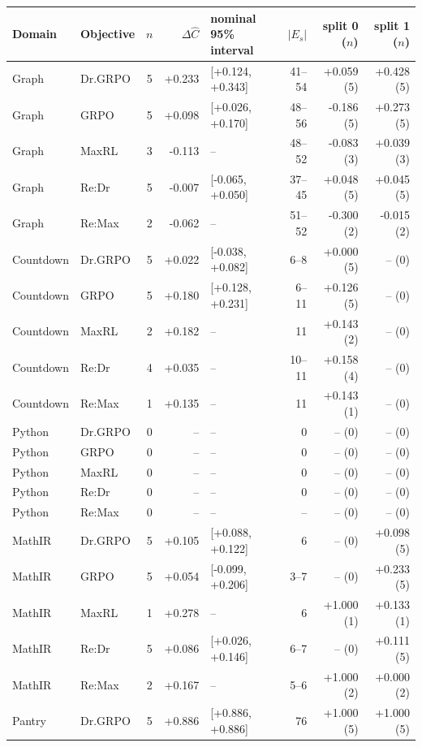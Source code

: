 \begin{table}[!htbp]
\centering
\scriptsize
\setlength{\tabcolsep}{3pt}
\begin{tabular}{@{}llcrlrrr@{}}
\toprule
Domain & Objective & $n$ & $\Delta\widehat C$ & nominal 95\% interval & $|E_s|$ & split 0 ($n$) & split 1 ($n$) \\
\midrule
Graph & Dr.GRPO & 5 & +0.233 & [+0.124, +0.343] & 41--54 & +0.059 (5) & +0.428 (5) \\
Graph & GRPO & 5 & +0.098 & [+0.026, +0.170] & 48--56 & -0.186 (5) & +0.273 (5) \\
Graph & MaxRL & 3 & -0.113 & -- & 48--52 & -0.083 (3) & +0.039 (3) \\
Graph & Re:Dr & 5 & -0.007 & [-0.065, +0.050] & 37--45 & +0.048 (5) & +0.045 (5) \\
Graph & Re:Max & 2 & -0.062 & -- & 51--52 & -0.300 (2) & -0.015 (2) \\
Countdown & Dr.GRPO & 5 & +0.022 & [-0.038, +0.082] & 6--8 & +0.000 (5) & -- (0) \\
Countdown & GRPO & 5 & +0.180 & [+0.128, +0.231] & 6--11 & +0.126 (5) & -- (0) \\
Countdown & MaxRL & 2 & +0.182 & -- & 11 & +0.143 (2) & -- (0) \\
Countdown & Re:Dr & 4 & +0.035 & -- & 10--11 & +0.158 (4) & -- (0) \\
Countdown & Re:Max & 1 & +0.135 & -- & 11 & +0.143 (1) & -- (0) \\
Python & Dr.GRPO & 0 & -- & -- & 0 & -- (0) & -- (0) \\
Python & GRPO & 0 & -- & -- & 0 & -- (0) & -- (0) \\
Python & MaxRL & 0 & -- & -- & 0 & -- (0) & -- (0) \\
Python & Re:Dr & 0 & -- & -- & 0 & -- (0) & -- (0) \\
Python & Re:Max & 0 & -- & -- & -- & -- (0) & -- (0) \\
MathIR & Dr.GRPO & 5 & +0.105 & [+0.088, +0.122] & 6 & -- (0) & +0.098 (5) \\
MathIR & GRPO & 5 & +0.054 & [-0.099, +0.206] & 3--7 & -- (0) & +0.233 (5) \\
MathIR & MaxRL & 1 & +0.278 & -- & 6 & +1.000 (1) & +0.133 (1) \\
MathIR & Re:Dr & 5 & +0.086 & [+0.026, +0.146] & 6--7 & -- (0) & +0.111 (5) \\
MathIR & Re:Max & 2 & +0.167 & -- & 5--6 & +1.000 (2) & +0.000 (2) \\
Pantry & Dr.GRPO & 5 & +0.886 & [+0.886, +0.886] & 76 & +1.000 (5) & +1.000 (5) \\

\end{tabular}
\end{table}
